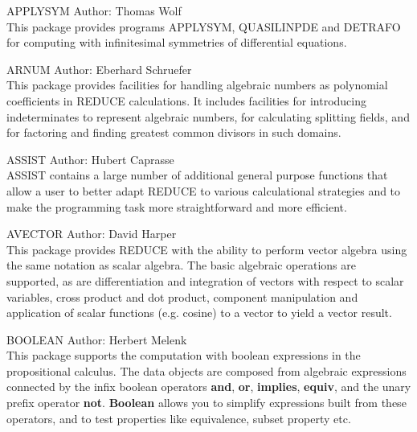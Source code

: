 \begin{Package}{APPLYSYM}
 
Author: Thomas Wolf \\

This package provides programs APPLYSYM, QUASILINPDE and DETRAFO for
computing with infinitesimal symmetries of differential equations.
\end{Package}

\begin{Package}{ARNUM}
Author: Eberhard Schruefer\\

This package provides facilities for handling algebraic numbers as polynomial
coefficients in REDUCE calculations.  It includes facilities for introducing
indeterminates to represent algebraic numbers, for calculating splitting
fields, and for factoring and finding greatest common divisors in such
domains.
\end{Package}

\begin{Package}{ASSIST}
Author: Hubert Caprasse\\

ASSIST contains a large number of additional general purpose functions
that allow a user to better adapt REDUCE to various calculational
strategies and to make the programming task more straightforward and more
efficient.
\end{Package}

\begin{Package}{AVECTOR}
Author: David Harper\\

This package provides REDUCE with the ability to perform vector algebra
using the same notation as scalar algebra.  The basic algebraic operations
are supported, as are differentiation and integration of vectors with
respect to scalar variables, cross product and dot product, component
manipulation and application of scalar functions (e.g. cosine) to a vector
to yield a vector result.
\end{Package}

\begin{Package}{BOOLEAN}
Author: Herbert Melenk\\

This package supports the computation with boolean expressions in the
propositional calculus.  The data objects are composed from algebraic
expressions connected by the infix boolean operators {\bf and}, {\bf or},
{\bf implies}, {\bf equiv}, and the unary prefix operator {\bf not}.
{\bf Boolean} allows you to simplify expressions built from these
operators, and to test properties like equivalence, subset property etc.
\end{Package}

